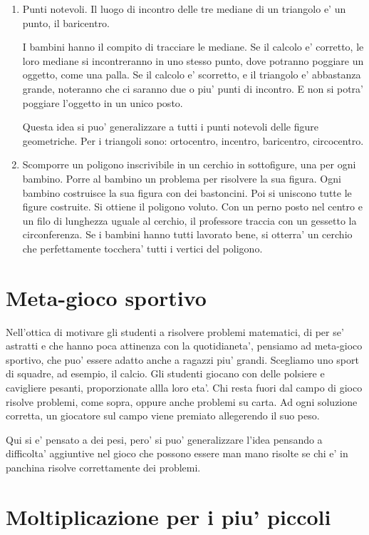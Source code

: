 \documentclass[a4paper]{article}
\begin{document}
\begin{enumerate}
    \item Punti notevoli. Il luogo di incontro delle tre mediane di un triangolo e' un punto, il baricentro.

        I bambini hanno il compito di tracciare le mediane. Se il calcolo e' corretto, le loro mediane si incontreranno in uno stesso punto, dove potranno poggiare un oggetto, come una palla. Se il calcolo e' scorretto, e il triangolo e' abbastanza grande, noteranno che ci saranno due o piu' punti di incontro. E non si potra' poggiare l'oggetto in un unico posto.

        Questa idea si puo' generalizzare a tutti i punti notevoli delle figure geometriche. Per i triangoli sono: ortocentro, incentro, baricentro, circocentro.

    \item Scomporre un poligono inscrivibile in un cerchio in sottofigure, una per ogni bambino. Porre al bambino un problema per risolvere la sua figura. Ogni bambino costruisce la sua figura con dei bastoncini. Poi si uniscono tutte le figure costruite. Si ottiene il poligono voluto. Con un perno posto nel centro e un filo di lunghezza uguale al cerchio, il professore traccia con un gessetto la circonferenza. Se i bambini hanno tutti lavorato bene, si otterra' un cerchio che perfettamente tocchera' tutti i vertici del poligono.

\end{enumerate}

\section{Meta-gioco sportivo}
Nell'ottica di motivare gli studenti a risolvere problemi matematici, di per se' astratti e che hanno poca attinenza con la quotidianeta', pensiamo ad meta-gioco sportivo, che puo' essere adatto anche a ragazzi piu' grandi. Scegliamo uno sport di squadre, ad esempio, il calcio. Gli studenti giocano con delle polsiere e cavigliere pesanti, proporzionate allla loro eta'. Chi resta fuori dal campo di gioco risolve problemi, come sopra, oppure anche problemi su carta. Ad ogni soluzione corretta, un giocatore sul campo viene premiato allegerendo il suo peso. 

Qui si e' pensato a dei pesi, pero' si puo' generalizzare l'idea pensando a difficolta' aggiuntive nel gioco che possono essere man mano risolte se chi e' in panchina risolve correttamente dei problemi.


\section{Moltiplicazione per i piu' piccoli}
\end{document}
